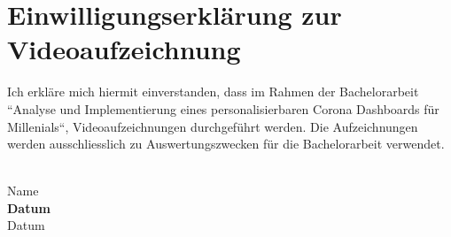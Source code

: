 \section{Einwilligungserklärung zur Videoaufzeichnung}
Ich erkläre mich hiermit einverstanden, dass im Rahmen der Bachelorarbeit ``Analyse und Implementierung eines personalisierbaren Corona Dashboards für Millenials``, Videoaufzeichnungen durchgeführt werden. Die Aufzeichnungen werden ausschliesslich zu Auswertungszwecken für die Bachelorarbeit verwendet.

\vspace{15mm}
\noindent
\makebox[60mm]{\hrulefill}\\
\textlangle{}Name\textrangle{} \\

\vspace{15mm}
\noindent
\textlangle{}\textbf{Datum}\textrangle{}\\
Datum\\